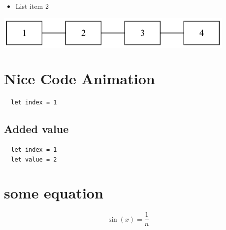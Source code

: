 \documentclass[11pt]{article}
\begin{document}
\begin{itemize}
\item List item 2
\end{itemize}

\begin{center}
\includegraphics[width=.9\linewidth]{test2.png}
\end{center}

\section*{Nice Code Animation}
\label{sec:org47059b4}
\begin{verbatim}
  let index = 1
\end{verbatim}


\subsection*{Added value}
\label{sec:orgc05d471}
\begin{verbatim}
  let index = 1
  let value = 2
\end{verbatim}

\section*{some equation}
\label{sec:org9a9442a}
\[ \sin(x) = \frac{1}{n} \]
\end{document}
